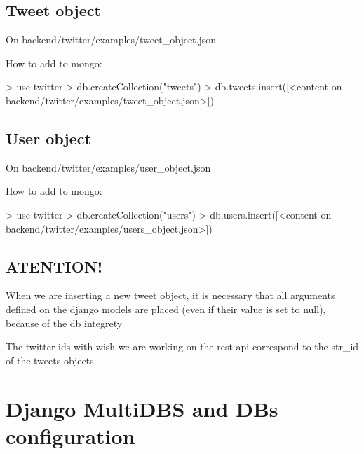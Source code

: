 \subsection*{Tweet object}


\begin{DoxyItemize}
\item On backend/twitter/examples/tweet\+\_\+object.\+json
\item How to add to mongo\+: 
\begin{DoxyCode}
> use twitter
> db.createCollection("tweets")
> db.tweets.insert([<content on backend/twitter/examples/tweet\_object.json>])
\end{DoxyCode}

\end{DoxyItemize}

\subsection*{User object}


\begin{DoxyItemize}
\item On backend/twitter/examples/user\+\_\+object.\+json
\item How to add to mongo\+: 
\begin{DoxyCode}
> use twitter
> db.createCollection("users")
> db.users.insert([<content on backend/twitter/examples/users\_object.json>])
\end{DoxyCode}

\end{DoxyItemize}

\subsection*{A\+T\+E\+N\+T\+I\+O\+N!}


\begin{DoxyItemize}
\item When we are inserting a new tweet object, it is necessary that all arguments defined on the django models are placed (even if their value is set to null), because of the db integrety
\item The twitter id\textquotesingle{}s with wish we are working on the rest api correspond to the str\+\_\+id of the tweets objects
\end{DoxyItemize}

\section*{Django Multi\+D\+BS and D\+Bs configuration}

